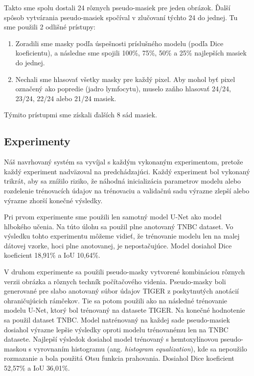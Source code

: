 Takto sme spolu dostali 24 rôznych pseudo-masiek pre jeden obrázok. Ďalší spôsob vytvárania pseudo-masiek spočíval v zlučovaní týchto 24 do jednej. Tu sme použili 2 odlišné prístupy:

\begin{enumerate}
    \item Zoradili sme masky podľa úspešnosti príslušného modelu (podľa Dice koeficientu), a následne sme spojili 100\%, 75\%, 50\% a 25\% najlepších masiek do jednej.
    \item Nechali sme hlasovať všetky masky pre každý pixel. Aby mohol byť pixel označený ako popredie (jadro lymfocytu), muselo zaňho hlasovať 24/24, 23/24, 22/24 alebo 21/24 masiek.
\end{enumerate}

Týmito prístupmi sme získali ďalších 8 sád masiek.

\subsection{Experimenty}
Náš navrhovaný systém sa vyvíjal s každým vykonaným experimentom, pretože každý experiment nadväzoval na predchádzajúci. Každý experiment bol vykonaný trikrát, aby sa znížilo riziko, že náhodná inicializácia parametrov modelu alebo rozdelenie trénovacích údajov na trénovaciu a validačnú sadu výrazne zlepší alebo výrazne zhorší konečné výsledky.

Pri prvom experimente sme použili len samotný model U-Net ako model hlbokého učenia. Na túto úlohu sa použil plne anotovaný TNBC dataset. Vo výsledku tohto experimentu môžeme vidieť, že trénovanie modelu len na malej dátovej vzorke, hoci plne anotovanej, je nepostačujúce. Model dosiahol Dice koeficient 18,91\% a IoU 10,64\%.

V druhom experimente sa použili pseudo-masky vytvorené kombináciou rôznych verzii obrázka a rôznych techník počítačového videnia. Pseudo-masky boli generované pre slabo anotovaný súbor údajov TIGER z poskytnutých anotácií ohraničujúcich rámčekov. Tie sa potom použili ako na následné trénovanie modelu U-Net, ktorý bol trénovaný na datasete TIGER. Na konečné hodnotenie sa použil dataset TNBC. Model natrénovaný na každej sade pseudo-masiek dosiahol výrazne lepšie výsledky oproti modelu trénovanému len na TNBC datasete. Najlepší výsledok dosiahol model trénovaný s hemtoxylínovou pseudo-maskou s vyrovnaním histogramu (ang. \textit{histogram equalization}), kde sa nepoužilo rozmazanie a bola použitá Otsu funkcia prahovania. Dosiahol Dice koeficient 52,57\% a IoU 36,01\%.

